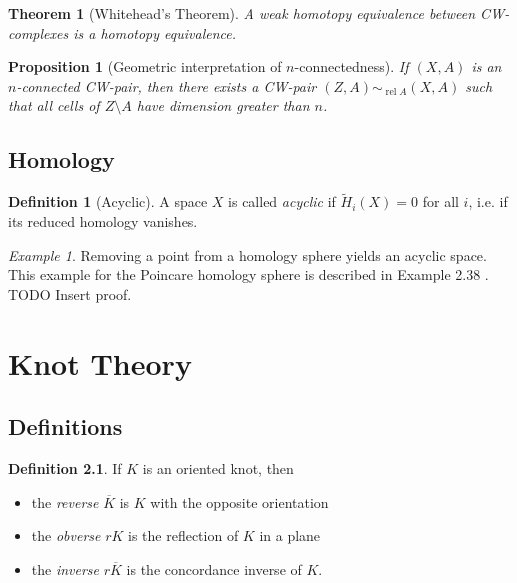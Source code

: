 \documentclass{tufte-book} %
\newtheorem{theorem}{Theorem}
\newtheorem{proposition}{Proposition}
\theoremstyle{definition}
\newtheorem{definition}{Definition}
\theoremstyle{remark}
\newtheorem{example}{Example}
\DeclareMathOperator{\rel}{rel}
\begin{document}
\begin{theorem}[Whitehead's Theorem]
	A weak homotopy equivalence between CW-complexes is a homotopy equivalence.
\end{theorem}

\begin{proposition}[Geometric interpretation of $n$-connectedness]
	If $(X, A)$ is an $n$-connected CW-pair, then there exists
	a CW-pair $(Z, A) \sim_{\rel A} (X, A)$
	such that all cells of $Z \setminus A$ have dimension greater than $n$.
\end{proposition}

\section{Homology}

\begin{definition}[Acyclic]
	A space $X$ is called \textit{acyclic} if $\widetilde{H}_{i}(X) = 0$ for all $i$,
	i.e. if its reduced homology vanishes.
\end{definition}

\begin{example}
	Removing a point from a homology sphere yields an acyclic space.
	This example for the Poincare homology sphere is described in
	Example 2.38 \cite{hatcher2002algebraic}.
	TODO Insert proof. %
\end{example}


\chapter{Knot Theory}

\section{Definitions}

\begin{definition}
	If $K$ is an oriented knot, then
	\begin{itemize}
		\item the \textit{reverse} $\overline{K}$
		is $K$ with the opposite orientation
		
		\item the \textit{obverse} $rK$ is
		the reflection of $K$ in a plane
		
		\item the \textit{inverse} $r \overline{K}$
		is the concordance inverse of $K$.
	\end{itemize}
\end{definition}
\end{document}
